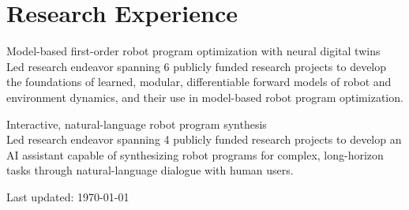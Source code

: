 \documentclass[11pt]{article} %
\begin{document}
\section*{Research Experience}

Model-based first-order robot program optimization with neural digital twins\\
Led research endeavor spanning 6 publicly funded research projects to develop the foundations of learned, modular, differentiable forward models of robot and environment dynamics, and their use in model-based robot program optimization.

Interactive, natural-language robot program synthesis\\
Led research endeavor spanning 4 publicly funded research projects to develop an AI assistant capable of synthesizing robot programs for complex, long-horizon tasks through natural-language dialogue with human users.


\vfill %


\begin{center}
	\scriptsize
	Last updated: \today
\end{center}

\end{document}
